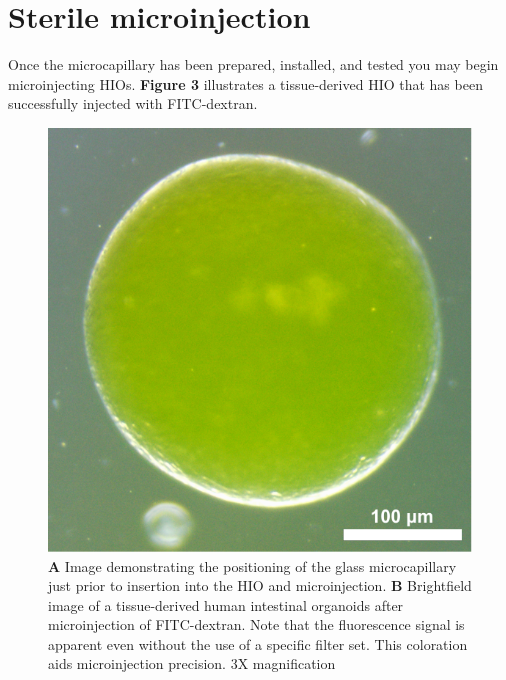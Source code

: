 \documentclass[11pt]{article}
\begin{document}
\section{{\sffamily } Sterile microinjection}
\label{sec:orgheadline56}
Once the microcapillary has been prepared, installed, and tested you may begin microinjecting HIOs. \textbf{Figure 3} illustrates a tissue-derived HIO that has been successfully injected with FITC-dextran.\\
\begin{figure}[h]
\centering
\includegraphics[width=0.95\linewidth]{./img/figure3.pdf}
\caption{\textbf{A} Image demonstrating the positioning of the glass microcapillary just prior to insertion into the HIO and microinjection. \textbf{B} Brightfield image of a tissue-derived human intestinal organoids after microinjection of FITC-dextran. Note that the fluorescence signal is apparent even without the use of a specific filter set. This coloration aids microinjection precision. 3X magnification}
\end{figure}
\end{document}
